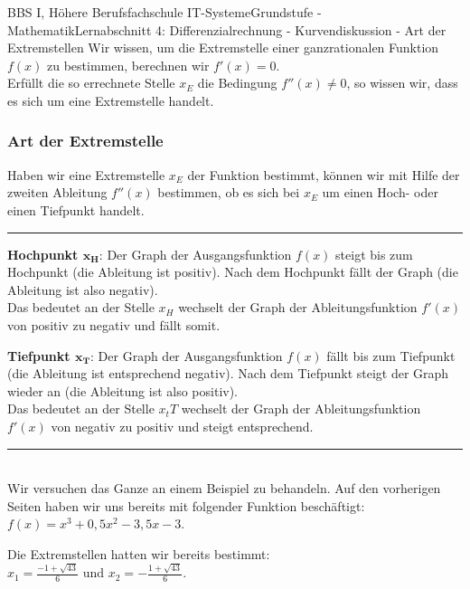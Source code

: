 \documentclass[11pt,twocolumn,oneside,openany,headings=optiontotoc,11pt,numbers=noenddot]{article}
\begin{document}
	\begin{worksheet}{BBS I, Höhere Berufsfachschule IT-Systeme}{Grundstufe - Mathematik}{Lernabschnitt 4: Differenzialrechnung - Kurvendiskussion - Art der Extremstellen}
		\setcounter{section}{7}
		\setcounter{subsection}{4}
		\noindent
		Wir wissen, um die Extremstelle einer ganzrationalen Funktion \(f(x)\) zu bestimmen, berechnen wir \(f'(x) = 0\).\\
		Erfüllt die so errechnete Stelle \(x_E\) die Bedingung \(f''(x) \neq{} 0\), so wissen wir, dass es sich um eine Extremstelle handelt.
		\subsubsection{Art der Extremstelle}
		Haben wir eine Extremstelle \(x_E\) der Funktion bestimmt, können wir mit Hilfe der zweiten Ableitung \(f''(x)\) bestimmen, ob es sich bei \(x_E\) um einen Hoch- oder einen Tiefpunkt handelt.\\
		\rule{0.48\textwidth}{0.1pt}
		\begin{framed}
			\noindent
			\textbf{Hochpunkt \(\mathbf{x_H}\)}: Der Graph der Ausgangsfunktion \(f(x)\) steigt bis zum Hochpunkt (die Ableitung ist positiv). Nach dem Hochpunkt fällt der Graph (die Ableitung ist also negativ).\\
			Das bedeutet an der Stelle \(x_H\) wechselt der Graph der Ableitungsfunktion \(f'(x)\) von positiv zu negativ und fällt somit.\\
			\par\noindent
			\textbf{Tiefpunkt \(\mathbf{x_T}\)}: Der Graph der Ausgangsfunktion \(f(x)\) fällt bis zum Tiefpunkt (die Ableitung ist entsprechend negativ). Nach dem Tiefpunkt steigt der Graph wieder an (die Ableitung ist also positiv).\\
			Das bedeutet an der Stelle \(x_tT\) wechselt der Graph der Ableitungsfunktion \(f'(x)\) von negativ zu positiv und steigt entsprechend.
		\end{framed}
		\noindent
		\rule{0.48\textwidth}{0.1pt}\\
		\noindent
		Wir versuchen das Ganze an einem Beispiel zu behandeln. Auf den vorherigen Seiten haben wir uns bereits mit folgender Funktion beschäftigt: \(f(x) = x^3 + 0,5x^2 - 3,5x - 3\).\\
		\par\noindent
		Die Extremstellen hatten wir bereits bestimmt:\\
		\(x_1= \frac{-1+\sqrt{43}}{6}\) und \(x_2 = -\frac{1+\sqrt{43}}{6}\).\\

\end{worksheet}
\end{document}
